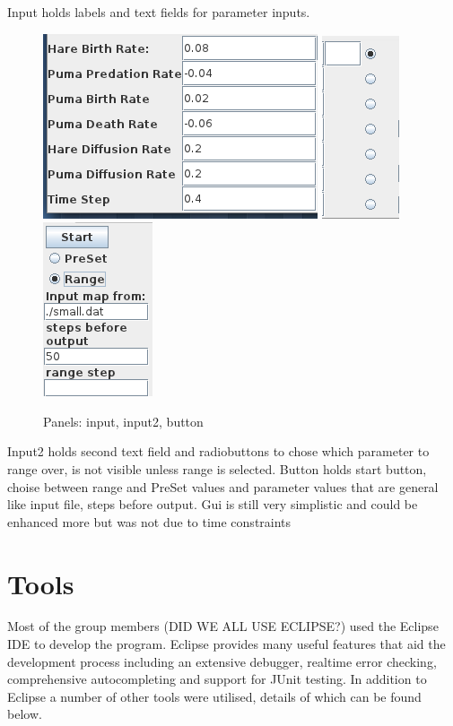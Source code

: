 \documentclass[11pt]{report}
\begin{document}
Input holds labels and text fields for parameter inputs. 
\begin{figure} [input]
\begin{center}
\includegraphics[scale = 0.5]{figs/input.png}
\includegraphics[scale = 0.5]{figs/input2.png}
\includegraphics[scale = 0.5]{figs/button.png}
\caption{Panels: input, input2, button}
\label{fig:input}
\end{center}
\end{figure}
Input2 holds second text field and radiobuttons to chose which parameter to range over, is not visible unless range is selected. 
Button holds start button, choise between range and PreSet values and parameter values that are general like input file, steps before output.
Gui is still very simplistic and could be enhanced more but was not due to time constraints
   
   \section{Tools}
Most of the group members (DID WE ALL USE ECLIPSE?) used the Eclipse IDE to develop the program. Eclipse provides many useful features that aid the development process including an extensive debugger, realtime error checking, comprehensive autocompleting and support for JUnit testing. In addition to Eclipse a number of other tools were utilised, details of which can be found below.
\end{document}
